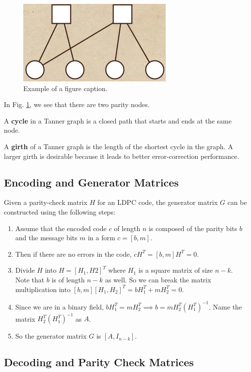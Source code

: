 \documentclass[conference]{IEEEtran}
\begin{document}
\begin{figure}[htbp]
  \centerline{\includegraphics{Images/tanner_graph.png}}
  \caption{Example of a figure caption.}
  \label{fig}
\end{figure}

In Fig. \ref{fig}, we see that there are two parity nodes.

A \textbf{cycle} in a Tanner graph is a closed path that starts and ends at the
same node.

A \textbf{girth} of a Tanner graph is the length of the shortest cycle in the
graph. A larger girth is desirable because it leads to better error-correction
performance.

\subsection{Encoding and Generator Matrices}
Given a parity-check matrix $H$ for an LDPC code, the generator matrix $G$ can
be constructed using the following steps:

\begin{enumerate}
  \item Assume that the encoded code $c$ of length $n$ is composed of the parity bits
        $b$ and the message bits $m$ in a form $c = [b, m]$.
  \item Then if there are no errors in the code, $cH^T = [b, m]H^T = 0$.
  \item Divide $H$ into $H = [H_1, H2]^T$ where $H_1$ is a square matrix of size $n-k$.
        Note that $b$ is of length $n-k$ as well. So we can break the matrix
        multiplication into $[b, m][H_1, H_2]^T = bH_1^T + mH_2^T = 0$.
  \item Since we are in a binary field, $bH_1^T = mH_2^T \implies b =
          mH_2^T(H_1^T)^{-1}$. Name the matrix $H_2^T(H_1^T)^{-1}$ as $A$.
  \item So the generator matrix $G$ is $[A, I_{n-k}]$.
\end{enumerate}

\subsection{Decoding and Parity Check Matrices}
\end{document}

